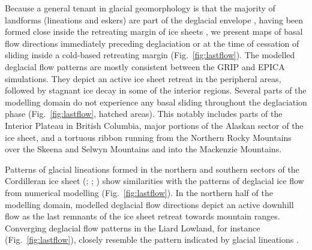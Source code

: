 \documentclass[tc]{copernicus}
\begin{document}
Because a general tenant in glacial geomorphology is that the majority of
landforms (lineations and eskers) are part of the deglacial envelope
\citep[terminology from][]{Kleman.etal.2006}, having been formed
close inside the retreating margin of ice sheets \citep{Boulton.Clark.1990,
Kleman.etal.1997, Kleman.etal.2010}, we present maps of basal flow directions
immediately preceding deglaciation or at the time of cessation of sliding
inside a cold-based retreating margin (Fig.~\ref{fig:lastflow}). The
modelled deglacial flow patterns are mostly consistent between the GRIP and EPICA
simulations. They depict an active ice sheet retreat in the peripheral areas,
followed by stagnant ice decay in some of the interior regions. Several parts
of the modelling domain do not experience any basal sliding throughout the
deglaciation phase (Fig.~\ref{fig:lastflow}, hatched areas). This notably
includes parts of the Interior Plateau in British Columbia, major
portions of the Alaskan sector of the ice sheet, and a tortuous ribbon running
from the Northern Rocky Mountains over the Skeena and Selwyn Mountains and into
the Mackenzie Mountains.

Patterns of glacial lineations formed in the northern and southern sectors of
the Cordilleran ice sheet (\citealp{Prest.etal.1968};
\citealp[Fig.~1.12]{Clague.1989}; \citealp[Fig.~2]{Kleman.etal.2010}) show
similarities with the patterns of deglacial ice flow from numerical modelling
(Fig.~\ref{fig:lastflow}). In the northern half
of the modelling domain, modelled deglacial flow directions depict an
active downhill flow as the last remnants of the ice sheet retreat towards
mountain ranges. Converging deglacial flow patterns in the Liard
Lowland, for instance (Fig.~\ref{fig:lastflow}), closely resemble the pattern
indicated by glacial lineations \citep[Fig.~2]{Margold.etal.2013}.
\end{document}
